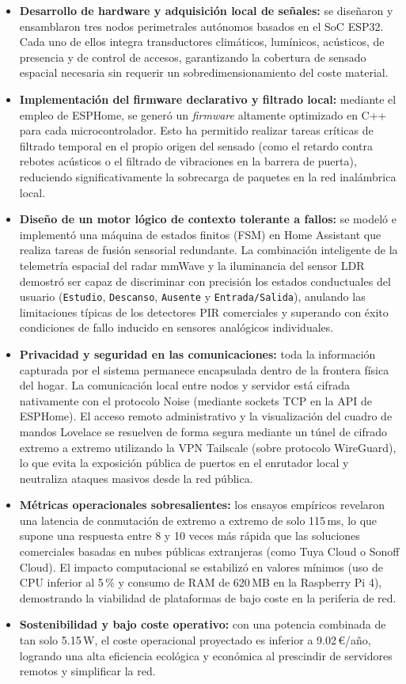 \begin{itemize}
    \item \textbf{Desarrollo de hardware y adquisición local de señales:} se diseñaron y ensamblaron tres nodos perimetrales autónomos basados en el SoC ESP32. Cada uno de ellos integra transductores climáticos, lumínicos, acústicos, de presencia y de control de accesos, garantizando la cobertura de sensado espacial necesaria sin requerir un sobredimensionamiento del coste material.
    \item \textbf{Implementación del firmware declarativo y filtrado local:} mediante el empleo de ESPHome, se generó un \textit{firmware} altamente optimizado en C++ para cada microcontrolador. Esto ha permitido realizar tareas críticas de filtrado temporal en el propio origen del sensado (como el retardo contra rebotes acústicos o el filtrado de vibraciones en la barrera de puerta), reduciendo significativamente la sobrecarga de paquetes en la red inalámbrica local.
    \item \textbf{Diseño de un motor lógico de contexto tolerante a fallos:} se modeló e implementó una máquina de estados finitos (FSM) en Home Assistant que realiza tareas de fusión sensorial redundante. La combinación inteligente de la telemetría espacial del radar mmWave y la iluminancia del sensor LDR demostró ser capaz de discriminar con precisión los estados conductuales del usuario (\texttt{Estudio}, \texttt{Descanso}, \texttt{Ausente} y \texttt{Entrada/Salida}), anulando las limitaciones típicas de los detectores PIR comerciales y superando con éxito condiciones de fallo inducido en sensores analógicos individuales.
    \item \textbf{Privacidad y seguridad en las comunicaciones:} toda la información capturada por el sistema permanece encapsulada dentro de la frontera física del hogar. La comunicación local entre nodos y servidor está cifrada nativamente con el protocolo Noise (mediante sockets TCP en la API de ESPHome). El acceso remoto administrativo y la visualización del cuadro de mandos Lovelace se resuelven de forma segura mediante un túnel de cifrado extremo a extremo utilizando la VPN Tailscale (sobre protocolo WireGuard), lo que evita la exposición pública de puertos en el enrutador local y neutraliza ataques masivos desde la red pública.
    \item \textbf{Métricas operacionales sobresalientes:} los ensayos empíricos revelaron una latencia de conmutación de extremo a extremo de solo 115\,ms, lo que supone una respuesta entre 8 y 10 veces más rápida que las soluciones comerciales basadas en nubes públicas extranjeras (como Tuya Cloud o Sonoff Cloud). El impacto computacional se estabilizó en valores mínimos (uso de CPU inferior al 5\,\% y consumo de RAM de 620\,MB en la Raspberry Pi 4), demostrando la viabilidad de plataformas de bajo coste en la periferia de red.
    \item \textbf{Sostenibilidad y bajo coste operativo:} con una potencia combinada de tan solo 5.15\,W, el coste operacional proyectado es inferior a 9.02\,\euro/año, logrando una alta eficiencia ecológica y económica al prescindir de servidores remotos y simplificar la red.
\end{itemize}

